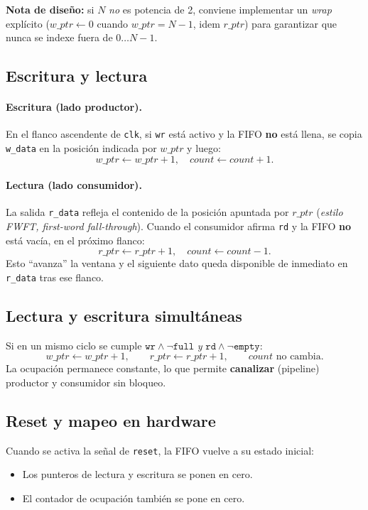 \textbf{Nota de diseño:} si \(N\) \emph{no} es potencia de 2, conviene implementar un \emph{wrap} explícito (\(w\_ptr \leftarrow 0\) cuando \(w\_ptr=N-1\), idem \(r\_ptr\)) para garantizar que nunca se indexe fuera de \(0 \ldots N-1\).

\subsection{Escritura y lectura}
\paragraph{Escritura (lado productor).}
En el flanco ascendente de \texttt{clk}, si \texttt{wr} está activo y la FIFO \textbf{no} está llena, se copia \texttt{w\_data} en la posición indicada por \(w\_ptr\) y luego:
\[
w\_ptr \leftarrow w\_ptr + 1,\quad count \leftarrow count + 1.
\]

\paragraph{Lectura (lado consumidor).}
La salida \texttt{r\_data} refleja el contenido de la posición apuntada por \(r\_ptr\) (\emph{estilo FWFT, first-word fall-through}). Cuando el consumidor afirma \texttt{rd} y la FIFO \textbf{no} está vacía, en el próximo flanco:
\[
r\_ptr \leftarrow r\_ptr + 1,\quad count \leftarrow count - 1.
\]
Esto “avanza” la ventana y el siguiente dato queda disponible de inmediato en \texttt{r\_data} tras ese flanco.

\subsection{Lectura y escritura simultáneas}
Si en un mismo ciclo se cumple \(\texttt{wr}\wedge\neg\texttt{full}\) \emph{y} \(\texttt{rd}\wedge\neg\texttt{empty}\):
\[
w\_ptr \leftarrow w\_ptr + 1,\qquad r\_ptr \leftarrow r\_ptr + 1,\qquad count \text{ no cambia}.
\]
La ocupación permanece constante, lo que permite \textbf{canalizar} (pipeline) productor y consumidor sin bloqueo.

\subsection{Reset y mapeo en hardware}

Cuando se activa la señal de \texttt{reset}, la FIFO vuelve a su estado inicial:
\begin{itemize}
    \item Los punteros de lectura y escritura se ponen en cero.
    \item El contador de ocupación también se pone en cero.
\end{itemize}

